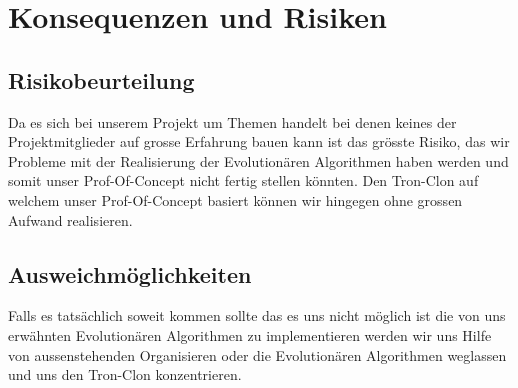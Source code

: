\documentclass{scrartcl}
\begin{document}
	
	\section{Konsequenzen und Risiken}
	
	\subsection{Risikobeurteilung}
	Da es sich bei unserem Projekt um Themen handelt bei denen keines der Projektmitglieder auf grosse Erfahrung bauen kann ist das grösste Risiko, das wir Probleme mit der Realisierung der Evolutionären Algorithmen haben werden und somit unser Prof-Of-Concept nicht fertig stellen könnten. 
	Den Tron-Clon auf welchem unser Prof-Of-Concept basiert können wir hingegen ohne grossen Aufwand realisieren.
	
	\subsection{Ausweichmöglichkeiten}
	Falls es tatsächlich soweit kommen sollte das es uns nicht möglich ist die von uns erwähnten Evolutionären Algorithmen zu implementieren werden wir uns Hilfe von aussenstehenden Organisieren oder die Evolutionären Algorithmen weglassen und uns den Tron-Clon konzentrieren. 
\end{document}
